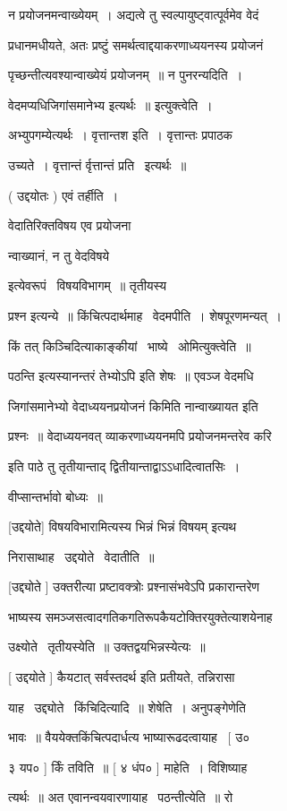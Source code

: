 \documentclass[11pt, openany]{book}
\begin{document}
न प्रयोजनमन्वाख्येयम्~। अद्यत्वे तु स्वल्पायुष्ट्वात्पूर्वमेव वेदं 

प्रधानमधीयते, अतः प्रष्टुं समर्थत्वाद्दयाकरणाध्ययनस्य प्रयोजनं 

पृच्छन्तीत्यवश्यान्वाख्येयं प्रयोजनम्~॥ न पुनरन्यदिति~। 

वेदमप्यधिजिगांसमानेभ्य इत्यर्थः~॥ इत्युक्त्वेति~। 

अभ्युपगम्येत्यर्थः~। वृत्तान्तश इति~। वृत्तान्तः प्रपाठक 

उच्यते~। वृत्तान्तं र्वृत्तान्तं प्रति \textendash\ इत्यर्थः~॥ 

( उद्दयोतः ) एवं तर्हीति~। {\qt वेदातिरिक्तविषय एव प्रयोजना \textendash\ 

न्वाख्यानं, न तु वेदविषये} इत्येवरूपं \textendash\ विषयविभागम्~॥ तृतीयस्य 

प्रश्न इत्यन्ये~॥ किंचित्पदार्थमाह \textendash\ वेदमपीति~। शेषपूरणमन्यत्~। 

किं तत् किञ्चिदित्याकाङ्कीयां \textendash\ भाष्ये \textendash\ ओमित्युक्त्वेति~॥ 

{\qt पठन्ति} इत्यस्यानन्तरं तेभ्योऽपि इति शेषः~॥ एवञ्ज वेदमधि \textendash\ 

जिगांसमानेभ्यो वेदाध्ययनप्रयोजनं किमिति नान्वाख्यायत इति 

प्रश्नः~॥ वेदाध्ययनवत् व्याकरणाध्ययनमपि प्रयोजनमन्तरेव करि \textendash\ 

इति पाठे तु तृतीयान्ताद् द्वितीयान्ताद्वाऽऽधादित्वातसिः~। 

वीप्सान्तर्भावो बोध्यः~॥ 

[उद्दयोते] विषयविभारामित्यस्य {\qt भिन्नं भिन्नं विषयम्} इत्यथ \textendash\ 

निरासाथाह \textendash\ उद्दयोते \textendash\ वेदातीति~॥ 

[उद्द्योते ] उक्तरीत्या प्रष्टावक्त्रोः प्रश्नासंभवेऽपि
प्रकारान्तरेण 

भाष्यस्य समञ्जसत्वादगतिकगतिरूपकैयटोक्तिरयुक्तेत्याशयेनाह \textendash\ 

उक्ष्योते \textendash\ तृतीयस्येति~॥ उक्तद्वयभिन्नस्येत्यः~॥ 

[ उद्दयोते ] कैयटात् सर्वस्तदर्थ इति प्रतीयते, तन्निरासा \textendash\ 

याह \textendash\ उद्द्योते \textendash\ किंचिदित्यादि~॥ शेषेति~। अनुपङ्गेणेति 

भावः~॥ वैययेक्तकिंचित्पदार्धत्य भाष्यारूढदत्वायाह \textendash\ [ उ० 

३ यप० ] र्किं तविति~॥ [ ४ धंप० ] माहेति~। विशिष्याह \textendash\ 

त्यर्थः~॥ अत एवानन्वयवारणायाह \textendash\ पठन्तीत्येति~॥ रो 
\end{document}
